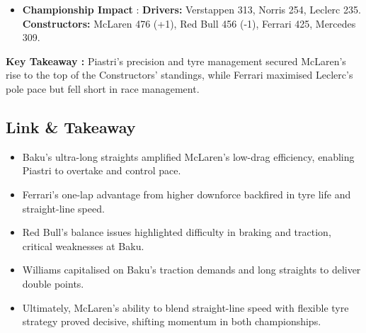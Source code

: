 \begin{itemize}
    \item \textbf{Championship Impact} : \textbf{Drivers:} Verstappen 313, Norris 254, Leclerc 235. \\
    \textbf{Constructors:} McLaren 476 (+1), Red Bull 456 (-1), Ferrari 425, Mercedes 309.
\end{itemize}

\textbf{Key Takeaway :} Piastri’s precision and tyre management secured McLaren’s rise to the top of the Constructors’ standings, while Ferrari maximised Leclerc’s pole pace but fell short in race management.

\subsection{Link \& Takeaway}

\begin{itemize}
    \item Baku’s ultra-long straights amplified McLaren’s low-drag efficiency, enabling Piastri to overtake and control pace. 
    \item Ferrari’s one-lap advantage from higher downforce backfired in tyre life and straight-line speed. 
    \item Red Bull’s balance issues highlighted difficulty in braking and traction, critical weaknesses at Baku.
    \item Williams capitalised on Baku’s traction demands and long straights to deliver double points. 
    \item Ultimately, McLaren’s ability to blend straight-line speed with flexible tyre strategy proved decisive, shifting momentum in both championships.
\end{itemize}
